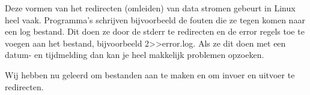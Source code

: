 Deze vormen van het redirecten (omleiden) van data stromen gebeurt in Linux heel vaak. Programma's schrijven
bijvoorbeeld de fouten die ze tegen komen naar een log bestand. Dit doen ze door de stderr te redirecten en de error
regels toe te voegen aan het bestand, bijvoorbeeld 2>>error.log. Als ze dit doen met een
datum- en tijdmelding dan kan je heel makkelijk problemen opzoeken.

Wij hebben nu geleerd om bestanden aan te maken en om invoer en uitvoer te redirecten.


